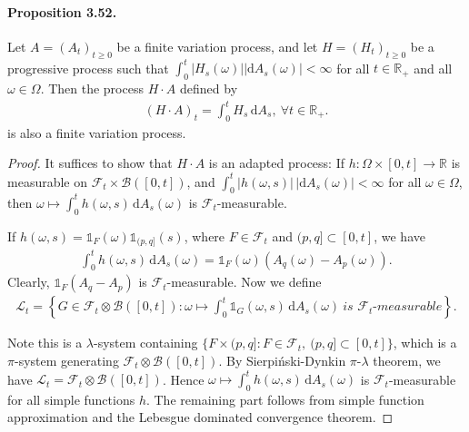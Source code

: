 \documentclass{article}
\numberwithin{equation}{section}
\renewcommand{\d}{\mathrm{d}}
\theoremstyle{plain}
\theoremstyle{definition}
\begin{document}
\paragraph{Proposition 3.52.\label{prop:3.52}} Let $A=(A_t)_{t\geq 0}$ be a finite variation process, and let $H=(H_t)_{t\geq 0}$ be a progressive process such that $\int_0^t\vert H_s(\omega)\vert\left\vert\d A_s(\omega)\right\vert < \infty$ for all $t\in\mathbb{R}_+$ and all $\omega\in\Omega$. Then the process $H\cdot A$ defined by
\begin{align*}
	(H\cdot A)_t = \int_0^t H_s\,\d A_s,\ \forall t\in\mathbb{R}_+.
\end{align*}
is also a finite variation process.
\begin{proof}
It suffices to show that $H\cdot A$ is an adapted process: If $h:\Omega\times[0,t]\to\mathbb{R}$ is measurable on $\mathscr{F}_t\times\mathscr{B}([0,t])$, and $\int_0^t\vert h(\omega,s)\vert\,\vert\d A_s(\omega)\vert < \infty$ for all $\omega\in\Omega$, then $\omega\mapsto\int_0^t h(\omega,s)\,\d A_s(\omega)$ is $\mathscr{F}_t$-measurable.

If $h(\omega,s)=\mathds{1}_F(\omega)\mathds{1}_{(p,q]}(s)$, where $F\in\mathscr{F}_t$ and $(p,q]\subset[0,t]$, we have
\begin{align*}
	\int_0^t h(\omega,s)\,\d A_s(\omega) = \mathds{1}_F(\omega)\left(A_q(\omega)-A_p(\omega)\right).
\end{align*}
Clearly, $\mathds{1}_F(A_q-A_p)$ is $\mathscr{F}_t$-measurable. Now we define
\begin{align*}
	\mathscr{L}_t=\left\{G\in\mathscr{F}_t\otimes\mathscr{B}([0,t]):\omega\mapsto\int_0^t\mathds{1}_G(\omega,s)\,\d A_s(\omega)\ \textit{is $\mathscr{F}_t$-measurable}\right\}.
\end{align*}

Note this is a $\lambda$-system containing $\{F\times(p,q]:F\in\mathscr{F}_t,\ (p,q]\subset[0,t]\}$, which is a $\pi$-system generating $\mathscr{F}_t\otimes\mathscr{B}([0,t])$. By Sierpiński-Dynkin $\pi$-$\lambda$ theorem, we have $\mathscr{L}_t=\mathscr{F}_t\otimes\mathscr{B}([0,t])$. Hence $\omega\mapsto\int_0^t h(\omega,s)\,\d A_s(\omega)$ is $\mathscr{F}_t$-measurable for all simple functions $h$. The remaining part follows from simple function approximation and the Lebesgue dominated convergence theorem.
\end{proof}
\end{document}
